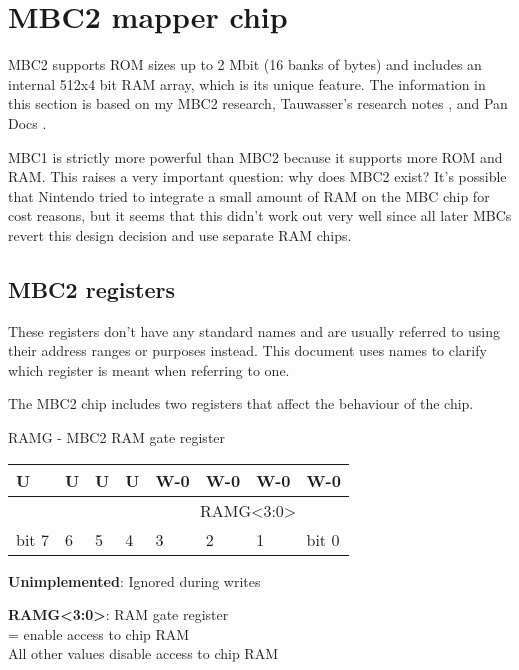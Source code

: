 \chapter{MBC2 mapper chip}

MBC2 supports ROM sizes up to 2 Mbit (16 banks of  bytes) and
includes an internal 512x4 bit RAM array, which is its unique feature. The
information in this section is based on my MBC2 research, Tauwasser's research
notes \cite{tauwasser_mbc2}, and Pan Docs \cite{pandocs}.

\begin{speculation}
  MBC1 is strictly more powerful than MBC2 because it supports more ROM and
  RAM. This raises a very important question: why does MBC2 exist? It's
  possible that Nintendo tried to integrate a small amount of RAM on the MBC
  chip for cost reasons, but it seems that this didn't work out very well since
  all later MBCs revert this design decision and use separate RAM chips.
\end{speculation}

\section{MBC2 registers}

\begin{caveat}
  These registers don't have any standard names and are usually referred to
  using their address ranges or purposes instead. This document uses names to
  clarify which register is meant when referring to one.
\end{caveat}

The MBC2 chip includes two registers that affect the behaviour of the chip.

\begin{register}[H]
  \caption{RAMG - MBC2 RAM gate register}
  {
    \ttfamily
    \begin{tabularx}{\textwidth}{|X|X|X|X|X|X|X|X|}
      \hline
      U                     & U                     & U                     & U                     & W-0                                    & W-0 & W-0 & W-0   \\
      \hline
      \cellcolor{LightGray} & \cellcolor{LightGray} & \cellcolor{LightGray} & \cellcolor{LightGray} & \multicolumn{4}{c|}{RAMG<3:0>} \\
      \hline
      bit 7                 & 6                     & 5                     & 4                     & 3                                      & 2   & 1   & bit 0 \\
      \hline
    \end{tabularx}
  }

  \begin{description}[leftmargin=5em, style=nextline]
    \item[bit 7-4]
      \textbf{Unimplemented}: Ignored during writes
    \item[bit 3-0]
      \textbf{RAMG<3:0>}: RAM gate register \\
      = enable access to chip RAM \\
      All other values disable access to chip RAM
  \end{description}
\end{register}

